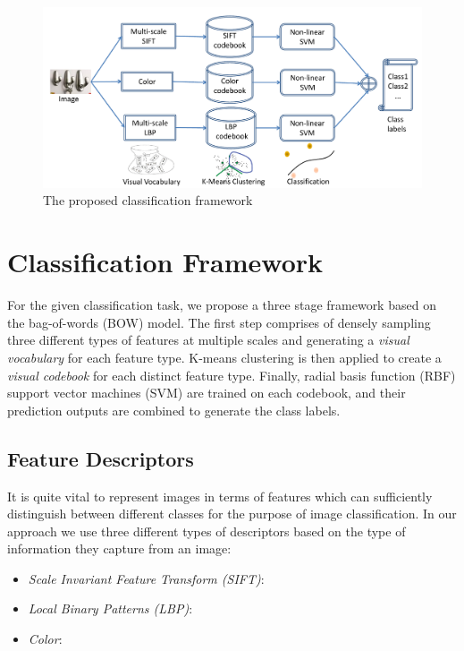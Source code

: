 \documentclass[12pt]{article}
\begin{document}
\begin{figure}
\includegraphics[width = 1\textwidth]{flowchart}
\caption{The proposed classification framework}
\end{figure}

\section{Classification Framework}
For the given classification task, we propose a three stage framework based on the bag-of-words (BOW) model.
The first step comprises of densely sampling three different types of features at multiple scales and generating a \textit{visual vocabulary} for each feature type.
K-means clustering is then applied to create a \textit{visual codebook} for each distinct feature type.
Finally, radial basis function (RBF) support vector machines (SVM) are trained on each codebook, and their prediction outputs are combined to generate the class labels.

\subsection{Feature Descriptors}
It is quite vital to represent images in terms of features which can sufficiently distinguish between different classes for the purpose of image classification. In our approach we use three different types of descriptors based on the type of information they capture from an image:

\begin{itemize}

\item \textit{Scale Invariant Feature Transform (SIFT)}:

\item \textit{Local Binary Patterns (LBP)}:

\item \textit{Color}:

\end{itemize}
\end{document}

